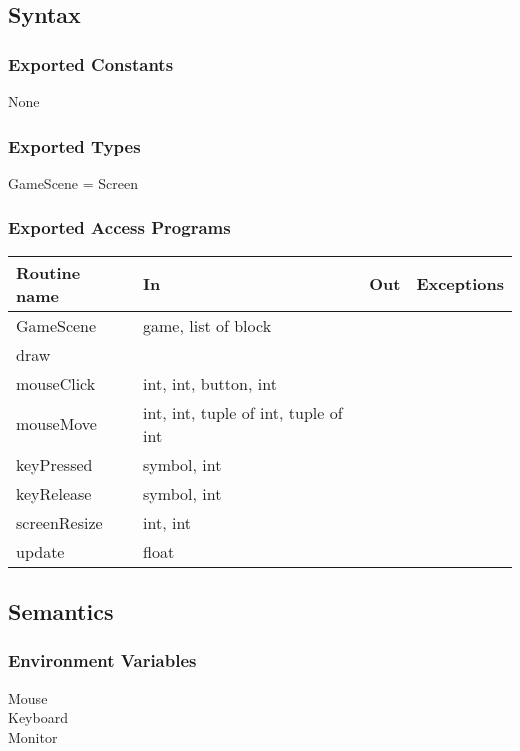 \documentclass{article}
\begin{document}
\subsection {Syntax}

\subsubsection {Exported Constants}
None

\subsubsection {Exported Types}
GameScene = Screen

\subsubsection {Exported Access Programs}
\begin{table}[!htbp]
\begin{tabular}{| l | l | l | l |}
\hline
\textbf{Routine name} & \textbf{In} & \textbf{Out} & \textbf{Exceptions}\\
\hline
GameScene & game, list of block & ~ & ~\\
\hline
draw & ~ & ~& ~\\
\hline
mouseClick & int, int, button, int & ~& ~\\
\hline
mouseMove & int, int, tuple of int, tuple of int & ~& ~\\
\hline
keyPressed & symbol, int & ~& ~\\
\hline
keyRelease & symbol, int & ~& ~\\
\hline
screenResize & int, int & ~& ~\\
\hline
update & float & ~& ~\\
\hline
\end{tabular}

\end{table}
\FloatBarrier

\subsection {Semantics}

\subsubsection {Environment Variables}
Mouse\\
Keyboard\\
Monitor
\end{document}
